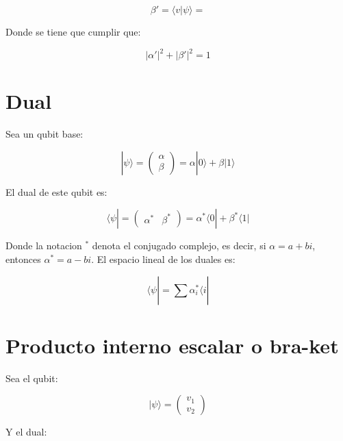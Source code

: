 \documentclass[11pt]{article}
\begin{document}
\begin{equation}
    \beta ' = \langle v | \psi \rangle =
\end{equation}

Donde se tiene que cumplir que:

\begin{equation}
    |\alpha '|^2 + |\beta '|^2 = 1
\end{equation}

\section{Dual}

Sea un qubit base:

\begin{equation}
    |\psi\rangle = \begin{pmatrix} \alpha \\ \beta \end{pmatrix} = \alpha |0\rangle + \beta |1\rangle
\end{equation}

El dual de este qubit es:

\begin{equation}
    \langle \psi | = \begin{pmatrix} \alpha^* & \beta^* \end{pmatrix} = \alpha^* \langle 0| + \beta^* \langle 1|
\end{equation}

Donde la notacion $^*$ denota el conjugado complejo, es decir, si $\alpha = a + bi$, entonces $\alpha^* = a - bi$. El espacio lineal de los duales es:

\begin{equation}
    \langle \psi | = \sum_{}^{} \alpha_i^* \langle i |
\end{equation}

\section{Producto interno escalar o bra-ket}

Sea el qubit:

\begin{equation}
    |\psi\rangle = \begin{pmatrix} v_1 \\ v_2 \end{pmatrix}
\end{equation}

Y el dual:
\end{document}
